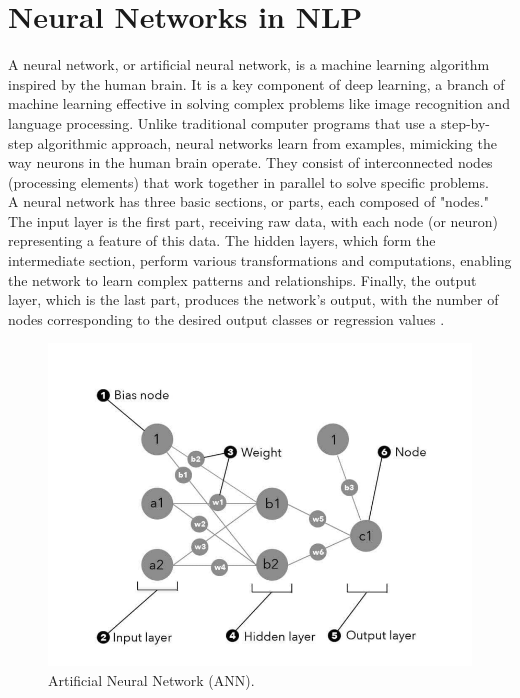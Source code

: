 \section{Neural Networks in NLP}
A neural network, or artificial neural network, is a machine learning algorithm inspired by the human brain. It is a key component of deep learning, a branch of machine learning effective in solving complex problems like image recognition and language processing. Unlike traditional computer programs that use a step-by-step algorithmic approach, neural networks learn from examples, mimicking the way neurons in the human brain operate. They consist of interconnected nodes (processing elements) that work together in parallel to solve specific problems. \\
A neural network has three basic sections, or parts, each composed of "nodes." \\ The input layer is the first part, receiving raw data, with each node (or neuron) representing a feature of this data. The hidden layers, which form the intermediate section, perform various transformations and computations, enabling the network to learn complex patterns and relationships. Finally, the output layer, which is the last part, produces the network's output, with the number of nodes corresponding to the desired output classes or regression values \cite{murugan2024nlp}.
\begin{figure}[htbp]
	
	\centerline{\includegraphics[width=.7\linewidth]{Figures/ANN.png}}
	\caption{Artificial Neural Network (ANN).}
	\label{ANN.png}
\end{figure}  


